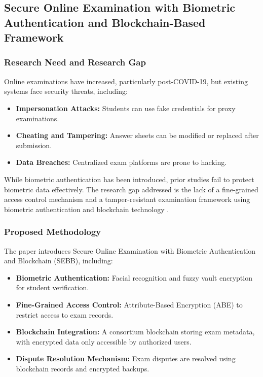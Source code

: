 \documentclass[12pt,a4paper]{article}
\begin{document}
\subsection{Secure Online Examination with Biometric Authentication and Blockchain-Based Framework}
\subsubsection{Research Need and Research Gap}
Online examinations have increased, particularly post-COVID-19, but existing systems face security threats, including:
\begin{itemize}
    \item \textbf{Impersonation Attacks:} Students can use fake credentials for proxy examinations.
    \item \textbf{Cheating and Tampering:} Answer sheets can be modified or replaced after submission.
    \item \textbf{Data Breaches:} Centralized exam platforms are prone to hacking.
\end{itemize}
While biometric authentication has been introduced, prior studies fail to protect biometric data effectively. The research gap addressed is the lack of a fine-grained access control mechanism and a tamper-resistant examination framework using biometric authentication and blockchain technology \cite{zhu2021secure}.

\subsubsection{Proposed Methodology}
The paper introduces Secure Online Examination with Biometric Authentication and Blockchain (SEBB), including:
\begin{itemize}
    \item \textbf{Biometric Authentication:} Facial recognition and fuzzy vault encryption for student verification.
    \item \textbf{Fine-Grained Access Control:} Attribute-Based Encryption (ABE) to restrict access to exam records.
    \item \textbf{Blockchain Integration:} A consortium blockchain storing exam metadata, with encrypted data only accessible by authorized users.
    \item \textbf{Dispute Resolution Mechanism:} Exam disputes are resolved using blockchain records and encrypted backups.
\end{itemize}
\end{document}
